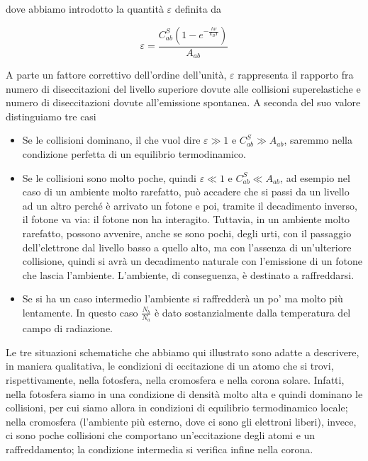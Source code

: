 dove abbiamo introdotto la quantità $\varepsilon$ definita da

\begin{equation*}
  \varepsilon=\frac{C_{ab}^S \left(1-e^{-\frac{h\nu}{k_B T}}\right)}{A_{ab}}
\end{equation*}

A parte un fattore correttivo dell'ordine dell'unità, $\varepsilon$ rappresenta il rapporto fra numero di diseccitazioni del livello superiore dovute alle collisioni superelastiche e numero di diseccitazioni dovute all'emissione spontanea. A seconda del suo valore distinguiamo tre casi

\begin{itemize}
  \item Se le collisioni dominano, il che vuol dire $\varepsilon \gg 1$ e $C_{ab}^S \gg A_{ab}$, saremmo nella condizione perfetta di un equilibrio termodinamico.
  \item Se le collisioni sono molto poche, quindi $\varepsilon \ll 1$ e $C_{ab}^S \ll A_{ab}$, ad esempio nel caso di un ambiente molto rarefatto, può accadere che si passi da un livello ad un altro perché è arrivato un fotone e poi, tramite il decadimento inverso, il fotone va via: il fotone non ha interagito. Tuttavia, in un ambiente molto rarefatto, possono avvenire, anche se sono pochi, degli urti, con il passaggio dell'elettrone dal livello basso a quello alto, ma con l'assenza di un'ulteriore collisione, quindi si avrà un decadimento naturale con l'emissione di un fotone che lascia l'ambiente. L'ambiente, di conseguenza, è destinato a raffreddarsi.
  \item Se si ha un caso intermedio l'ambiente si raffredderà un po' ma molto più lentamente. In questo caso $\frac{N_b}{N_a}$ è dato sostanzialmente dalla temperatura del campo di radiazione. 
\end{itemize}

Le tre situazioni schematiche che abbiamo qui illustrato sono adatte a descrivere, in maniera qualitativa, le condizioni di eccitazione di un atomo che si trovi, rispettivamente, nella fotosfera, nella cromosfera e nella corona solare. Infatti, nella fotosfera siamo in una condizione di densità molto alta e quindi dominano le collisioni, per cui siamo allora in condizioni di equilibrio termodinamico locale; nella cromosfera (l'ambiente più esterno, dove ci sono gli elettroni liberi), invece, ci sono poche collisioni che comportano un'eccitazione degli atomi e un raffreddamento; la condizione intermedia si verifica infine nella corona.

